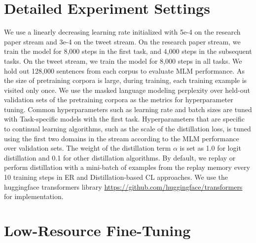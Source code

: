 \section{Detailed Experiment Settings}
\label{sec:hyps}
We use a linearly decreasing learning rate initialized with 5e-4 on the research paper stream and 3e-4 on the tweet stream. On the research paper stream, we train the model for 8,000 steps in the first task, and 4,000 steps in the subsequent tasks. On the tweet stream, we train the model for 8,000 steps in all tasks. We hold out 128,000 sentences from each corpus to evaluate MLM performance. As the size of pretraining corpora is large, during training, each training example is visited only once. We use the masked language modeling perplexity over held-out validation sets of the pretraining corpora as the metrics for hyperparameter tuning. 
Common hyperparameters such as learning rate and batch sizes are tuned with Task-specific models with the first task. Hyperparameters that are specific to continual learning algorithms, such as the scale of the distillation loss, is tuned using the first two domains in the stream according to the MLM performance over validation sets. The weight of the distillation term $\alpha$ is set as 1.0 for logit distillation and 0.1 for other distillation algorithms. By default, we replay or perform distillation with a mini-batch of examples from the replay memory every 10 training steps in ER and Distillation-based CL approaches. We use the huggingface transformers library \url{https://github.com/huggingface/transformers} for implementation.




\section{Low-Resource Fine-Tuning}
\label{apdx:low_resource}




